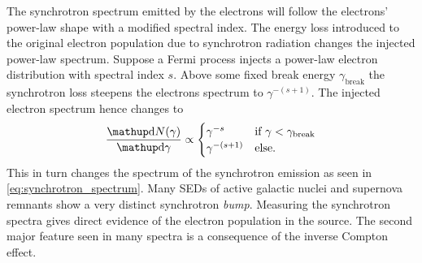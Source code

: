 The synchrotron spectrum emitted by the electrons will follow the electrons' power-law shape with a modified spectral index. 
The energy loss introduced to the original electron population due to synchrotron radiation changes the 
injected power-law spectrum. Suppose a Fermi process injects a power-law electron distribution
with spectral index $s$. 
Above some fixed break energy $\gamma_{\text{break}}$  the synchrotron loss steepens the electrons spectrum to $\gamma^{-(s+1)}$. 
The injected electron spectrum hence changes to 
\begin{equation}
  \label{eq:electron_break}
  \frac{\diff{N(\gamma)}}{\diff{\gamma}} \propto \begin{cases}
    \gamma^{-s} & \text{if $\gamma < \gamma_{\text{break}}$} \\ 
    \gamma^{-(s+1)} & \text{else.}
  \end{cases}
\end{equation}
This in turn changes the spectrum of the synchrotron emission as seen in \eqref{eq:synchrotron_spectrum}. 
Many SEDs of active galactic nuclei and supernova remnants show a very distinct synchrotron \emph{bump}. Measuring the 
synchrotron spectra gives direct evidence of the electron population in the source. The second major feature seen in many spectra 
is a consequence of the inverse Compton effect.
